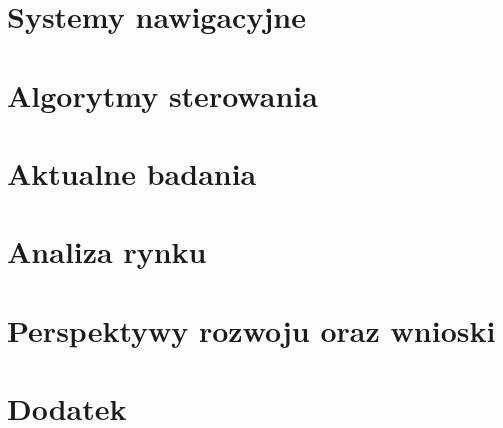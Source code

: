 \documentclass[a4paper,2pt,twoside]{report} %
\begin{document}
\chapter{Systemy nawigacyjne}


\chapter{Algorytmy sterowania}


\chapter{Aktualne badania}


\chapter{Analiza rynku}


\chapter{Perspektywy rozwoju oraz wnioski}


%

\appendix
\chapter{Dodatek}


\listoffigures

\printbibliography[
heading=bibintoc
]
%
%
\end{document}
